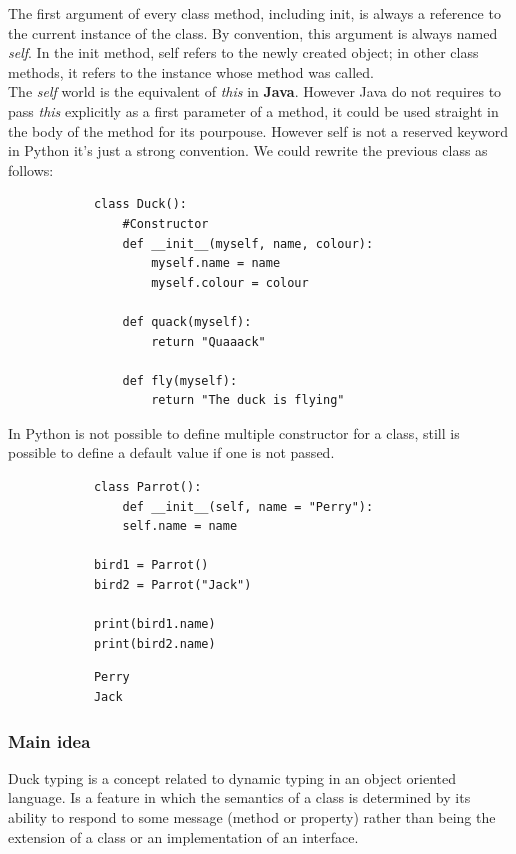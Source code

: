 \documentclass[12pt]{article}
\begin{document}
		The first argument of every class method, including init, is always a reference to the current instance of the class. By convention, this argument is always named \textit{self}. In the init method, self refers to the newly created object; in other class methods, it refers to the instance whose method was called. \\
		The \textit{self} world is the equivalent of \textit{this} in \textbf{Java}. However Java do not requires to pass \textit{this} explicitly as a first parameter of a method, it could be used straight in the body of the method for its pourpouse.  	
		However self is not a reserved keyword in Python it’s just a strong convention. We could rewrite the previous class as follows:
		
		\begin{lstlisting}
			class Duck():
				#Constructor 
				def __init__(myself, name, colour):
					myself.name = name
					myself.colour = colour
			
				def quack(myself):
					return "Quaaack"
			
				def fly(myself):
					return "The duck is flying"
		\end{lstlisting}
		
		In Python is not possible to define multiple constructor for a class, still is possible to define a default value if one is not passed.
		
		\begin{lstlisting}
			class Parrot():
				def __init__(self, name = "Perry"):
				self.name = name
			
			bird1 = Parrot()
			bird2 = Parrot("Jack")
			
			print(bird1.name)
			print(bird2.name)
		\end{lstlisting}
		
		\begin{lstlisting}
			Perry
			Jack
		\end{lstlisting}
		
		
		\subsubsection{Main idea}
			
			Duck typing is a concept related to dynamic typing in an object oriented language. Is a feature in which the semantics of a class is determined by its ability to respond to some message (method or property) rather than being the extension of a class or an implementation of an interface. \\
\end{document}
